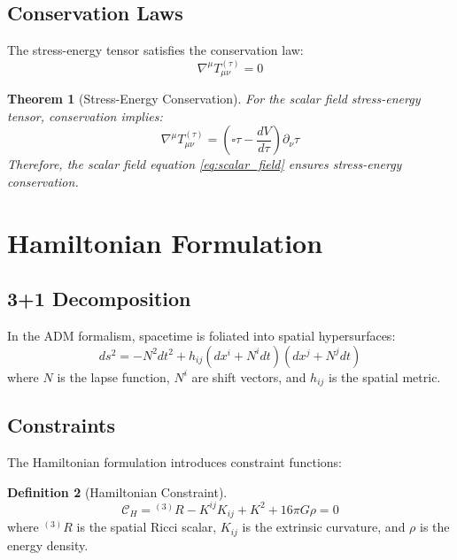 \documentclass[11pt,a4paper]{article}
\newtheorem{theorem}{Theorem}[section]
\theoremstyle{definition}
\newtheorem{definition}[theorem]{Definition}
\theoremstyle{remark}
\newcommand{\constraint}{\mathcal{C}}
\newcommand{\covd}{\nabla}
\newcommand{\dAlem}{\square}
\begin{document}
\subsection{Conservation Laws}

The stress-energy tensor satisfies the conservation law:
\begin{equation}
\covd^\mu T_{\mu\nu}^{(\tau)} = 0
\end{equation}

\begin{theorem}[Stress-Energy Conservation]
For the scalar field stress-energy tensor, conservation implies:
\begin{equation}
\covd^\mu T_{\mu\nu}^{(\tau)} = \left(\dAlem \tau - \frac{dV}{d\tau}\right) \partial_\nu \tau
\end{equation}
Therefore, the scalar field equation \eqref{eq:scalar_field} ensures stress-energy conservation.
\end{theorem}

\section{Hamiltonian Formulation}

\subsection{3+1 Decomposition}

In the ADM formalism, spacetime is foliated into spatial hypersurfaces:
\begin{equation}
ds^2 = -N^2 dt^2 + h_{ij}(dx^i + N^i dt)(dx^j + N^j dt)
\end{equation}
where $N$ is the lapse function, $N^i$ are shift vectors, and $h_{ij}$ is the spatial metric.

\subsection{Constraints}

The Hamiltonian formulation introduces constraint functions:

\begin{definition}[Hamiltonian Constraint]
\begin{equation}
\constraint_H = {}^{(3)}R - K^{ij}K_{ij} + K^2 + 16\pi G \rho = 0
\end{equation}
where ${}^{(3)}R$ is the spatial Ricci scalar, $K_{ij}$ is the extrinsic curvature, and $\rho$ is the energy density.
\end{definition}
\end{document}

